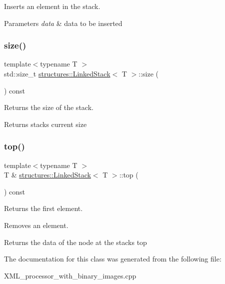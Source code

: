 Inserts an element in the stack. 


\begin{DoxyParams}{Parameters}
{\em data} & data to be inserted \\
\hline
\end{DoxyParams}
\mbox{\label{classstructures_1_1LinkedStack_ae1ca6a5a9b837471863f1c8bb23cfe1d}} 
\subsubsection{\texorpdfstring{size()}{size()}}
{\footnotesize\ttfamily template$<$typename T $>$ \\
std\+::size\+\_\+t \mbox{\hyperlink{classstructures_1_1LinkedStack}{structures\+::\+Linked\+Stack}}$<$ T $>$\+::size (\begin{DoxyParamCaption}{ }\end{DoxyParamCaption}) const}



Returns the size of the stack. 

\begin{DoxyReturn}{Returns}
stack\textquotesingle{}s current size 
\end{DoxyReturn}
\mbox{\label{classstructures_1_1LinkedStack_a14ab6e3507dd1206a87bba8c57e1733f}} 
\subsubsection{\texorpdfstring{top()}{top()}}
{\footnotesize\ttfamily template$<$typename T $>$ \\
T \& \mbox{\hyperlink{classstructures_1_1LinkedStack}{structures\+::\+Linked\+Stack}}$<$ T $>$\+::top (\begin{DoxyParamCaption}{ }\end{DoxyParamCaption}) const}



Returns the first element. 

Removes an element.

\begin{DoxyReturn}{Returns}
the data of the node at the stack\textquotesingle{}s top 
\end{DoxyReturn}


The documentation for this class was generated from the following file\+:\begin{DoxyCompactItemize}
\item 
X\+M\+L\+\_\+processor\+\_\+with\+\_\+binary\+\_\+images.\+cpp\end{DoxyCompactItemize}
